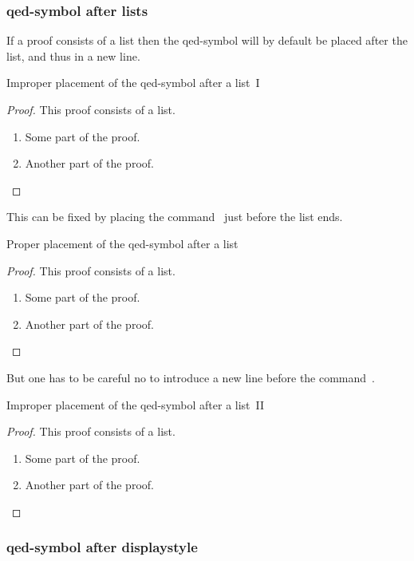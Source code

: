 \subsubsection{qed-symbol after lists}

If a proof consists of a list then the qed-symbol will by default be placed after the list, and thus in a new line.
\begin{showlatex}{Improper placement of the qed-symbol after a list~I}
\begin{proof}
  This proof consists of a list.
  \begin{enumerate}
    \item
      Some part of the proof.
    \item
      Another part of the proof.
  \end{enumerate}
\end{proof}
\end{showlatex}
This can be fixed by placing the command~ just before the list ends.
\begin{showlatex}{Proper placement of the qed-symbol after a list}
\begin{proof}
  This proof consists of a list.
  \begin{enumerate}
    \item
      Some part of the proof.
    \item
      Another part of the proof.
    \qedhere
  \end{enumerate}
\end{proof}
\end{showlatex}
But one has to be careful no to introduce a new line before the command~.
\begin{showlatex}{Improper placement of the qed-symbol after a list~II}
\begin{proof}
  This proof consists of a list.
  \begin{enumerate}
    \item
      Some part of the proof.
    \item
      Another part of the proof.
      
    \qedhere
  \end{enumerate}
\end{proof}
\end{showlatex}

\subsubsection{qed-symbol after displaystyle}

